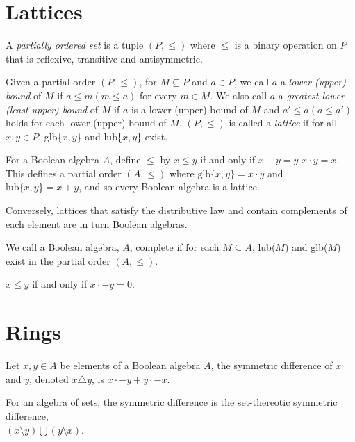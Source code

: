 \documentclass[12pt]{article}
\begin{document}
\section{Lattices}

\begin{definition}
A \textit{partially ordered set} is a tuple $(P,\le)$ where $\le$ is a binary operation on $P$ that is reflexive, transitive and antisymmetric.
\end{definition}

\begin{definition}
Given a partial order $(P,\le)$, for $M\subseteq P$ and $a\in P$, we call $a$ a \textit{lower (upper) bound} of $M$ if $a\le m (m\le a)$ for every $m\in M$. We also call $a$ a \textit{greatest lower (least upper) bound} of $M$ if $a$ is a lower (upper) bound of $M$ and $a'\le a (a\le a')$ holds for each lower (upper) bound of $M$. $(P,\le)$ is called a \textit{lattice} if for all $x,y\in P$, glb\{$x,y$\} and lub\{$x,y$\} exist.
\end{definition}

\begin{lemma}
For a Boolean algebra $A$, define $\le$ by $x\le y$ if and only if $x+y=y$ $x\cdot y=x$. This defines a partial order $(A,\le)$ where $\text{glb}\{x,y\}=x\cdot y$ and $\text{lub}\{x,y\}=x+y$, and so every Boolean algebra is a lattice.
\end{lemma}
Conversely, lattices that satisfy the distributive law and contain complements of each element are in turn Boolean algebras.

\begin{definition}
We call a Boolean algebra, $A$, complete if for each $M\subseteq A$, lub($M$) and glb($M$) exist in the partial order $(A,\le)$.
\end{definition}

\begin{lemma}
$x\le y$ if and only if $x\cdot -y = 0$.
\end{lemma}

\section{Rings}

\begin{definition}
Let $x,y\in A$ be elements of a Boolean algebra $A$, the symmetric difference of $x$ and $y$, denoted $x\triangle y$, is $x\cdot-y+y\cdot-x$.
\end{definition}
For an algebra of sets, the symmetric difference is the set-thereotic symmetric difference, \\$(x\setminus y)\bigcup(y\setminus x)$.
\end{document}
